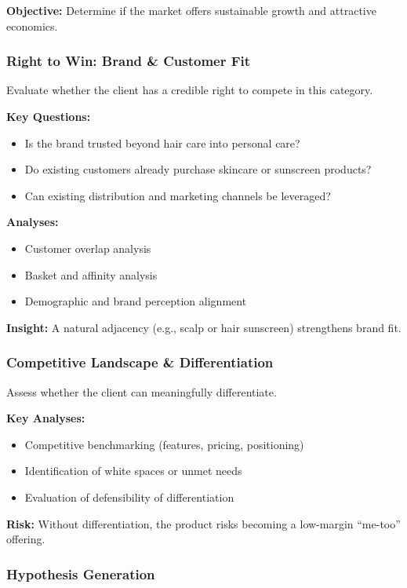 \documentclass[10pt,a4paper]{article}
\begin{document}
	\textbf{Objective:} Determine if the market offers sustainable growth and attractive economics.
	
	\subsubsection{Right to Win: Brand \& Customer Fit}
	
	Evaluate whether the client has a credible right to compete in this category.
	
	\textbf{Key Questions:}
	\begin{itemize}
	    \item Is the brand trusted beyond hair care into personal care?
	    \item Do existing customers already purchase skincare or sunscreen products?
	    \item Can existing distribution and marketing channels be leveraged?
	\end{itemize}
	
	\textbf{Analyses:}
	\begin{itemize}
	    \item Customer overlap analysis
	    \item Basket and affinity analysis
	    \item Demographic and brand perception alignment
	\end{itemize}
	
	\textbf{Insight:} A natural adjacency (e.g., scalp or hair sunscreen) strengthens brand fit.
	
	\subsubsection{Competitive Landscape \& Differentiation}
	
	Assess whether the client can meaningfully differentiate.
	
	\textbf{Key Analyses:}
	\begin{itemize}
	    \item Competitive benchmarking (features, pricing, positioning)
	    \item Identification of white spaces or unmet needs
	    \item Evaluation of defensibility of differentiation
	\end{itemize}
	
	\textbf{Risk:} Without differentiation, the product risks becoming a low-margin “me-too” offering.
	
	\subsubsection{Hypothesis Generation}
	
\end{document}
